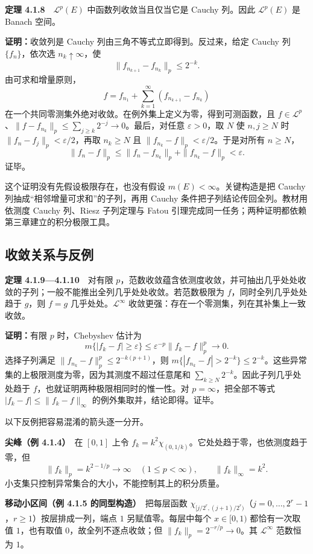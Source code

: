 \documentclass[11pt,a4paper]{article}
\begin{document}
\textbf{定理 4.1.8}　\(\mathcal L^p(E)\) 中函数列收敛当且仅当它是 Cauchy
列。因此 \(\mathcal L^p(E)\) 是 Banach 空间。

\textbf{证明：}收敛列是 Cauchy 列由三角不等式立即得到。反过来，给定
Cauchy 列 \(\{f_n\}\)，依次选 \(n_k\uparrow\infty\)，使 \[
\|f_{n_{k+1}}-f_{n_k}\|_p\le2^{-k}.
\] 由可求和增量原则， \[
f=f_{n_1}+\sum_{k=1}^\infty(f_{n_{k+1}}-f_{n_k})
\] 在一个共同零测集外绝对收敛。在例外集上定义为零，得到可测函数，且
\(f\in\mathcal L^p\)、\(\|f-f_{n_k}\|_p\le\sum_{j\ge k}2^{-j}\to0\)。最后，对任意
\(\varepsilon>0\)，取 \(N\) 使 \(n,j\ge N\) 时
\(\|f_n-f_j\|_p<\varepsilon/2\)，再取 \(n_k\ge N\) 且
\(\|f_{n_k}-f\|_p<\varepsilon/2\)。于是对所有 \(n\ge N\)， \[
\|f_n-f\|_p\le\|f_n-f_{n_k}\|_p+\|f_{n_k}-f\|_p<\varepsilon.
\] 证毕。

这个证明没有先假设极限存在，也没有假设 \(m(E)<\infty\)。关键构造是把
Cauchy 列抽成``相邻增量可求和''的子列，再用 Cauchy
条件把子列结论传回全列。教材用依测度 Cauchy 列、Riesz 子列定理与 Fatou
引理完成同一任务；两种证明都依赖第三章建立的积分极限工具。

\subsection{收敛关系与反例}\label{ch04-s1-ux6536ux655bux5173ux7cfbux4e0eux53cdux4f8b}

\textbf{定理 4.1.9---4.1.10}　对有限
\(p\)，范数收敛蕴含依测度收敛，并可抽出几乎处处收敛的子列；一般不能推出全列几乎处处收敛。若范数极限为
\(f\)，同时全列几乎处处趋于 \(g\)，则 \(f=g\)
几乎处处。\(\mathcal L^\infty\)
收敛更强：存在一个零测集，列在其补集上一致收敛。

\textbf{证明：}有限 \(p\) 时，Chebyshev 估计为 \[
m\{|f_k-f|\ge\varepsilon\}\le\varepsilon^{-p}\|f_k-f\|_p^p\longrightarrow0.
\] 选择子列满足 \(\|f_{n_k}-f\|_p^p\le2^{-k(p+1)}\)，则
\(m\{|f_{n_k}-f|>2^{-k}\}\le2^{-k}\)。这些异常集的上极限测度为零，因为其测度不超过任意尾和
\(\sum_{k\ge N}2^{-k}\)。因此子列几乎处处趋于
\(f\)，也就证明两种极限相同时的惟一性。对 \(p=\infty\)，把全部不等式
\(|f_k-f|\le\|f_k-f\|_\infty\) 的例外集取并，结论即得。证毕。

以下反例把容易混淆的箭头逐一分开。

\textbf{尖峰（例 4.1.4）}　在 \([0,1]\) 上令
\(f_k=k^2\chi_{(0,1/k)}\)。它处处趋于零，也依测度趋于零，但 \[
\|f_k\|_p=k^{2-1/p}\longrightarrow\infty\quad(1\le p<\infty),\qquad
\|f_k\|_\infty=k^2.
\] 小支集只控制异常集合的大小，不能控制其上的积分质量。

\textbf{移动小区间（例 4.1.5 的同型构造）}　把每层函数
\(\chi_{[j/2^r,(j+1)/2^r)}\)（\(j=0,\ldots,2^r-1\)，\(r\ge1\)）按层排成一列，端点
\(1\) 另赋值零。每层中每个 \(x\in[0,1)\) 都恰有一次取值 \(1\)，也有取值
\(0\)，故全列不逐点收敛；但 \(\|f_k\|_p=2^{-r/p}\to0\)。其
\(\mathcal L^\infty\) 范数恒为 \(1\)。
\end{document}
